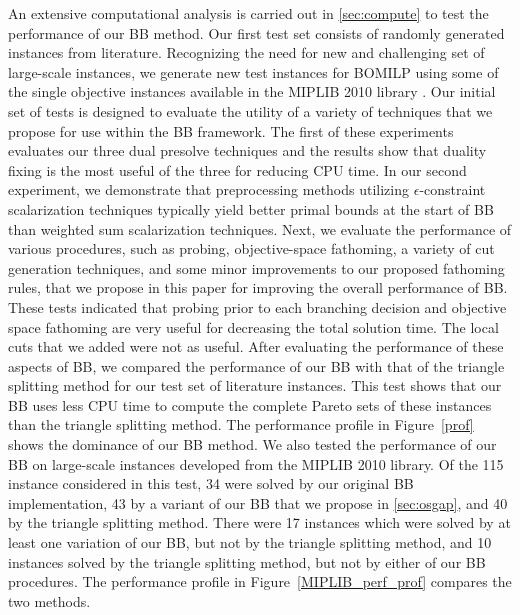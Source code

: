 \documentclass[11.5pt]{article}
\newcommand{\bb}{BB}
\newcommand{\comment}[1]{{\color{red} #1}}
\begin{document}
An extensive computational analysis is carried out in \textsection\ref{sec:compute} to test the performance of our \bb{} method. Our first test set consists of randomly generated instances from literature. Recognizing the need for new and challenging set of large-scale instances, we generate new test instances for BOMILP using some of the single objective instances available in the MIPLIB 2010 library \citep{koch2011miplib}. Our initial set of tests is designed to evaluate the utility of a variety of techniques that we propose for use within the \bb{} framework. The first of these experiments evaluates our three dual presolve techniques %
and the results show that duality fixing is the most useful of the three for reducing CPU time. In our second experiment, we demonstrate that preprocessing methods utilizing $\epsilon$-constraint scalarization techniques typically yield better primal bounds at the start of \bb{} than  weighted sum scalarization techniques. Next, we evaluate the performance of various procedures, such as probing, objective-space fathoming, a variety of cut generation techniques, and some minor improvements to our proposed fathoming rules, that we propose in this paper for improving the overall performance of \bb{}. These tests indicated that probing prior to each branching decision and objective space fathoming are very useful for decreasing the total solution time. 
The local cuts that we added were not as useful. After evaluating the performance of these aspects of \bb{}, we compared the performance of our \bb{} with that of the triangle splitting method \citep{boland2015acriterion} for our test set of literature instances. %
This test shows that our \bb{} uses less CPU time %
to compute the complete Pareto sets of these instances than the triangle splitting method. The performance profile in Figure~\ref{prof} shows the dominance of our \bb{} method. We also tested the performance of our \bb{} on large-scale instances developed from the MIPLIB 2010 library. Of the 115 instance considered in this test, 34 were solved by our original \bb{} implementation, 43 by a variant of our \bb{} that we propose in \textsection\ref{sec:osgap}, and 40 by the triangle splitting method. There were 17 instances which were solved by at least one variation of our \bb{}, but not by the triangle splitting method, and 10 instances solved by the triangle splitting method, but not by either of our \bb{} procedures. The performance profile in Figure~\ref{MIPLIB_perf_prof} compares the two methods. %
\end{document}

